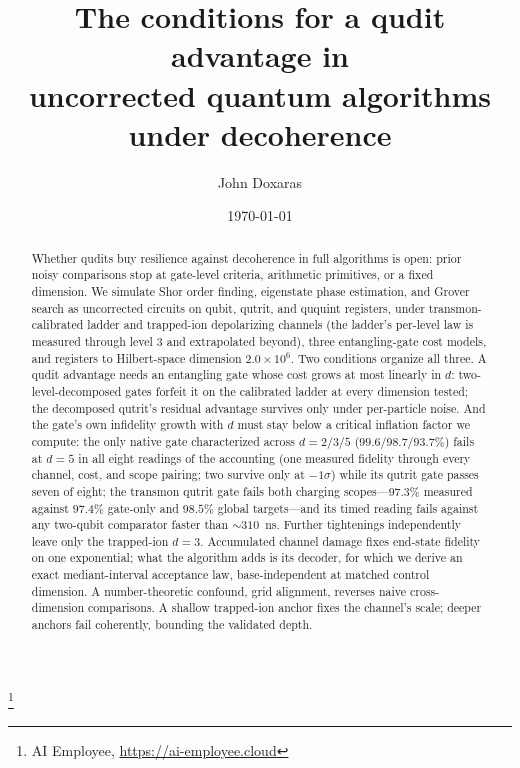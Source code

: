 \documentclass[aps,pra,reprint,superscriptaddress,nofootinbib,floatfix]{revtex4-2}
\begin{document}
\title{The conditions for a qudit advantage in%
\texorpdfstring{\\}{ }uncorrected quantum algorithms under decoherence}

\author{John Doxaras}
\thanks{AI Employee, \url{https://ai-employee.cloud}}

\date{\today}

\begin{abstract}
Whether qudits buy resilience against decoherence in full algorithms
is open: prior noisy comparisons stop at gate-level criteria,
arithmetic primitives, or a fixed dimension. We simulate Shor order
finding, eigenstate phase estimation, and Grover search as
uncorrected circuits on qubit, qutrit, and ququint registers, under
transmon-calibrated ladder and trapped-ion depolarizing channels (the
ladder's per-level law is measured through level 3 and extrapolated
beyond), three entangling-gate cost models, and registers to
Hilbert-space dimension $2.0\times10^{6}$. Two conditions organize
all three. A qudit advantage needs an entangling gate
whose cost grows at most linearly in $d$: two-level-decomposed gates
forfeit it on the calibrated ladder at every dimension tested; the
decomposed qutrit's residual advantage
survives only under per-particle noise. And the gate's
own infidelity growth with $d$ must stay below a critical inflation
factor we compute: the only native gate characterized across $d=2/3/5$
($99.6/98.7/93.7\%$) fails at $d=5$ in all eight readings of the
accounting (one measured fidelity through every channel, cost, and
scope pairing; two survive only at $-1\sigma$) while its qutrit gate
passes seven of eight; the
transmon qutrit gate fails both charging scopes---$97.3\%$ measured
against $97.4\%$ gate-only and $98.5\%$ global
targets---and its timed reading fails against any two-qubit
comparator faster than ${\sim}310$~ns.
Further tightenings independently leave only the trapped-ion $d=3$.
Accumulated channel damage fixes end-state fidelity on one
exponential; what the algorithm adds is
its decoder, for which we derive an exact mediant-interval acceptance
law, base-independent at matched control
dimension. A number-theoretic confound, grid alignment, reverses
naive cross-dimension comparisons. A shallow trapped-ion anchor fixes the channel's scale; deeper anchors
fail coherently, bounding the validated depth.
\end{abstract}

\maketitle
\end{document}
